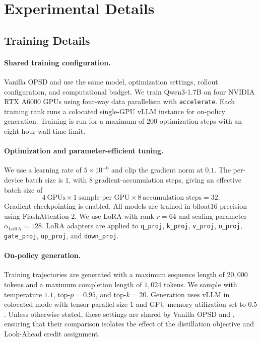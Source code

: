 \section{Experimental Details}
\label{sec:exp_details}
\subsection{Training Details}
\label{sec:training_detail}
\paragraph{Shared training configuration.}
Vanilla OPSD and \ours{} use the same model, optimization settings, rollout configuration,
and computational budget. We train Qwen3-1.7B on four NVIDIA RTX A6000 GPUs using
four-way data parallelism with \texttt{accelerate}. Each training rank runs a colocated
single-GPU vLLM instance for on-policy generation. Training is run for a maximum of
$200$ optimization steps with an eight-hour wall-time limit.

\paragraph{Optimization and parameter-efficient tuning.}
We use a learning rate of $5\times10^{-6}$ and clip the gradient norm at $0.1$.
The per-device batch size is $1$, with $8$ gradient-accumulation steps, giving an effective
batch size of
\begin{equation}
    4\ \text{GPUs}
    \times 1\ \text{sample per GPU}
    \times 8\ \text{accumulation steps}
    = 32.
\end{equation}
Gradient checkpointing is enabled. All models are trained in bfloat16 precision using
FlashAttention-2. We use LoRA with rank $r=64$ and scaling parameter
$\alpha_{\mathrm{LoRA}}=128$. LoRA adapters are applied to
\texttt{q\_proj}, \texttt{k\_proj}, \texttt{v\_proj}, \texttt{o\_proj},
\texttt{gate\_proj}, \texttt{up\_proj}, and \texttt{down\_proj}.

\paragraph{On-policy generation.}
Training trajectories are generated with a maximum sequence length of $20{,}000$ tokens
and a maximum completion length of $1{,}024$ tokens. We sample with temperature $1.1$,
top-$p=0.95$, and top-$k=20$. Generation uses vLLM in colocated mode with tensor-parallel
size $1$ and GPU-memory utilization set to $0.5$. Unless otherwise stated, these settings
are shared by Vanilla OPSD and \ours{}, ensuring that their comparison isolates the effect of
the distillation objective and Look-Ahead credit assignment.


